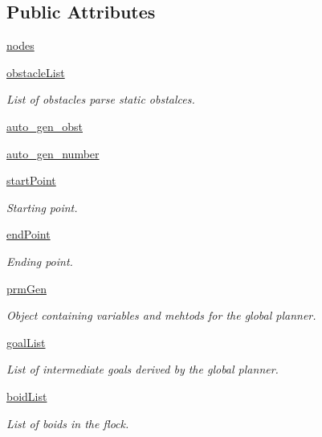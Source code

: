 \subsection*{Public Attributes}
\begin{DoxyCompactItemize}
\item 
\hyperlink{classconfiguration_1_1PolyFileConfiguration_a38883bf395763bf87ad3ca8279f0300f}{nodes}
\item 
\hyperlink{classconfiguration_1_1PolyFileConfiguration_a4ea5eea95680f3bfdad4adce0578a0f0}{obstacle\-List}
\begin{DoxyCompactList}\small\item\em List of obstacles parse static obstalces. \end{DoxyCompactList}\item 
\hyperlink{classconfiguration_1_1PolyFileConfiguration_a23d5fb751d566d6705ffd1bec2e63db9}{auto\-\_\-gen\-\_\-obst}
\item 
\hyperlink{classconfiguration_1_1PolyFileConfiguration_aa3e815b8a45413bbb05095ef9dba3fe7}{auto\-\_\-gen\-\_\-number}
\item 
\hyperlink{classconfiguration_1_1PolyFileConfiguration_ae5c780baacd4b800d1646a29a8608cbf}{start\-Point}
\begin{DoxyCompactList}\small\item\em Starting point. \end{DoxyCompactList}\item 
\hyperlink{classconfiguration_1_1PolyFileConfiguration_acb9da93ddecef1bb34bbce601473f0f1}{end\-Point}
\begin{DoxyCompactList}\small\item\em Ending point. \end{DoxyCompactList}\item 
\hyperlink{classconfiguration_1_1PolyFileConfiguration_a075aa5177145a1041468f24e4829e8e8}{prm\-Gen}
\begin{DoxyCompactList}\small\item\em Object containing variables and mehtods for the global planner. \end{DoxyCompactList}\item 
\hyperlink{classconfiguration_1_1PolyFileConfiguration_a2fd4dfe65bb97105e3ff146d125849df}{goal\-List}
\begin{DoxyCompactList}\small\item\em List of intermediate goals derived by the global planner. \end{DoxyCompactList}\item 
\hyperlink{classconfiguration_1_1PolyFileConfiguration_a34104bbe3eb34147465a4d9e05d6c6b6}{boid\-List}
\begin{DoxyCompactList}\small\item\em List of boids in the flock. \end{DoxyCompactList}\end{DoxyCompactItemize}
